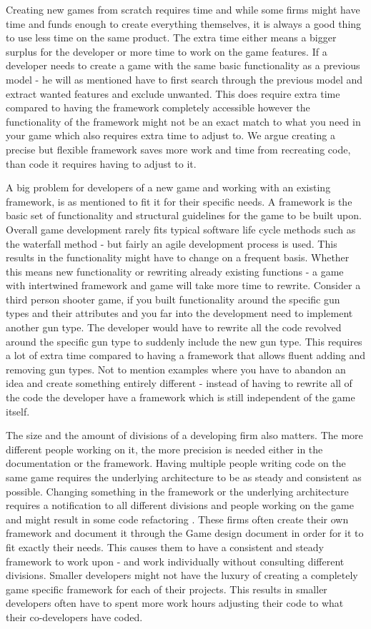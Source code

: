 Creating new games from scratch requires time and while some firms might have time and funds enough to create everything themselves, it is always a good thing to use less time on the same product. The extra time either means a bigger surplus for the developer or more time to work on the game features. If a developer needs to create a game with the same basic functionality as a previous model - he will as mentioned have to first search through the previous model and extract wanted features and exclude unwanted. This does require extra time compared to having the framework completely accessible however the functionality of the framework might not be an exact match to what you need in your game which also requires extra time to adjust to. We argue creating a precise but flexible framework saves more work and time from recreating code, than code it requires having to adjust to it.

A big problem for developers of a new game and working with an existing framework, is as mentioned to fit it for their specific needs. A framework is the basic set of functionality and structural guidelines for the game to be built upon. Overall game development rarely fits typical software life cycle methods such as the waterfall method - but fairly an agile development process is used\cite{Gamedevelopment}. This results in the functionality might have to change on a frequent basis. Whether this means new functionality or rewriting already existing functions - a game with intertwined framework and game will take more time to rewrite. Consider a third person shooter game, if you built functionality around the specific gun types and their attributes and you far into the development need to implement another gun type. The developer would have to rewrite all the code revolved around the specific gun type to suddenly include the new gun type. This requires a lot of extra time compared to having a framework that allows fluent adding and removing gun types. Not to mention examples where you have to abandon an idea and create something entirely different - instead of having to rewrite all of the code the developer have a framework which is still independent of the game itself.

The size and the amount of divisions of a developing firm also matters. The more different people working on it, the more precision is needed either in the documentation or the framework. Having multiple people writing code on the same game requires the underlying architecture to be as steady and consistent as possible. Changing something in the framework or the underlying architecture requires a notification to all different divisions and people working on the game and might result in some code refactoring \cite{Gameprod}. These firms often create their own framework and document it through the Game design document \cite{Gamedesign} in order for it to fit exactly their needs. This causes them to have a consistent and steady framework to work upon - and work individually without consulting different divisions. Smaller developers might not have the luxury of creating a completely game specific framework for each of their projects. This results in smaller developers often have to spent more work hours adjusting their code to what their co-developers have coded.

